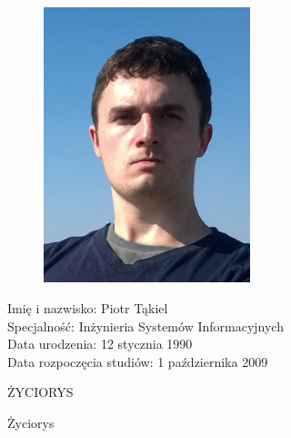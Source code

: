 \documentclass[../thesis.tex]{subfiles}
\begin{document}
{
\begin{figure}
\begin{center}
\includegraphics[width=6cm]{gfx/foto.jpg}
\end{center}
\end{figure}

\setlength{\parindent}{0pt}

Imię i nazwisko: Piotr Tąkiel\\
Specjalność: Inżynieria Systemów Informacyjnych\\
Data urodzenia: 12 stycznia 1990\\
Data rozpoczęcia studiów: 1 października 2009\\

\vspace{4cm}
\begin{center}
\huge ŻYCIORYS
\end{center}

\vspace{2cm}
Życiorys

}
\newpage
\end{document}
